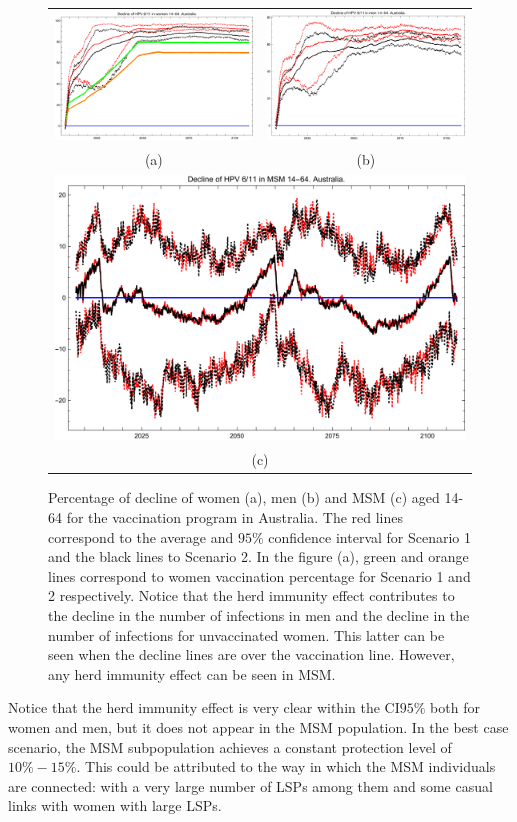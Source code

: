 \begin{figure}[!]
	\centering
	\begin{tabular}{cc}
		\includegraphics[width=0.5\linewidth]{IMGs/3.-Australia/Decl_muj_14_64_verr_Australia.pdf}	& 
		\includegraphics[width=0.5\linewidth]{IMGs/3.-Australia/Decl_hom_14_64_verr_Australia.pdf}  \\ 
		(a)	& (b) \\ 
		\multicolumn{2}{c}{ \includegraphics[width=0.5\linewidth]{IMGs/3.-Australia/Decl_MSM_14_64_verr_Australia.pdf} } \\ 
		\multicolumn{2}{c}{(c)} \\ 
	\end{tabular} 
	\caption{Percentage of decline of women (a), men (b) and MSM (c) aged 14-64 for the vaccination program in Australia. The red lines correspond to the average and $95\%$ confidence interval for Scenario 1 and the black lines to Scenario 2. In the figure (a), green and orange lines correspond to women vaccination percentage for Scenario 1 and 2 respectively. Notice that the herd immunity effect contributes to the decline in the number of infections in men and the decline in the number of infections for unvaccinated women. This latter can be seen when the decline lines are over the vaccination line. However, any herd immunity effect can be seen in MSM.}
	\label{fig:decline_AUS_6_11_14_64}
\end{figure}

Notice that the herd immunity effect is very clear within the CI$95\%$ both for women and men, but it does not appear in the MSM population. In the best case scenario, the MSM subpopulation achieves a constant protection level of $10\%-15\%$. This could be attributed to the way in which the MSM individuals are connected: with a very large number of LSPs among them and some casual links with women with large LSPs.